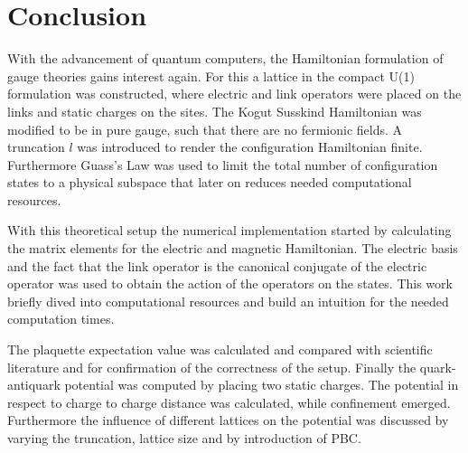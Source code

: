 \section{Conclusion}
With the advancement of quantum computers, the Hamiltonian formulation of gauge theories gains interest again. For this a lattice in the compact U(1) formulation was constructed, where electric and link operators were placed on the links and static charges on the sites. The Kogut Susskind Hamiltonian was modified to be in pure gauge, such that there are no fermionic fields. A truncation $l$ was introduced to render the configuration Hamiltonian finite. Furthermore Guass's Law was used to limit the total number of configuration states to a physical subspace that later on reduces needed computational resources.

With this theoretical setup the numerical implementation started by calculating the matrix elements for the electric and magnetic Hamiltonian. The electric basis and the fact that the link operator is the canonical conjugate of the electric operator was used to obtain the action of the operators on the states. This work briefly dived into computational resources and build an intuition for the needed computation times.

The plaquette expectation value was calculated and compared with scientific literature and for confirmation of the correctness of the setup. Finally the quark-antiquark potential was computed by placing two static charges. The potential in respect to charge to charge distance was calculated, while confinement emerged. Furthermore the influence of different lattices on the potential was discussed by varying the truncation, lattice size and by introduction of PBC.

